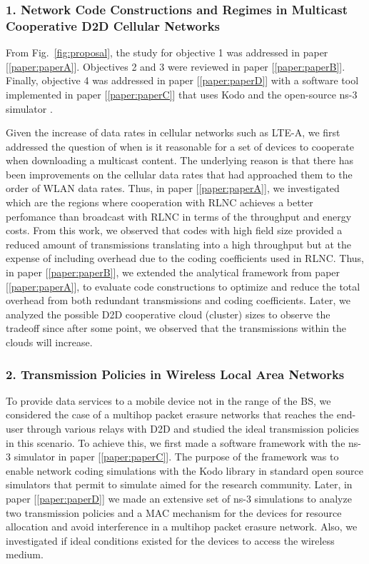\subsubsection{1. Network Code Constructions and Regimes in Multicast Cooperative D2D Cellular Networks}

From Fig.~\ref{fig:proposal}, the study for objective 1 was addressed in paper {[\ref{paper:paperA}]}. Objectives 2 and 3 were reviewed in paper {[\ref{paper:paperB}]}. Finally, objective 4 was addressed in paper {[\ref{paper:paperD}]} with a software tool implemented in paper {[\ref{paper:paperC}]} that uses Kodo and the open-source ns-3 simulator \cite{ns3link}.

Given the increase of data rates in cellular networks such as \ac{LTE-A}, we first addressed the question of when is it reasonable for a set of devices to cooperate when downloading a multicast content. The underlying reason is that there has been improvements on the cellular data rates that had approached them to the order of \ac{WLAN} data rates. Thus, in paper {[\ref{paper:paperA}]}, we investigated which are the regions where cooperation with \ac{RLNC} achieves a better perfomance than broadcast with \ac{RLNC} in terms of the throughput and energy costs. From this work, we observed that codes with high field size provided a reduced amount of transmissions translating into a high throughput but at the expense of including overhead due to the coding coefficients used in \ac{RLNC}. Thus, in paper {[\ref{paper:paperB}]}, we extended the analytical framework from paper {[\ref{paper:paperA}]}, to evaluate code constructions to optimize and reduce the total overhead from both redundant transmissions and coding coefficients. Later, we analyzed the possible \ac{D2D} cooperative cloud (cluster) sizes to observe the tradeoff since after some point, we observed that the transmissions within the clouds will increase.

\subsubsection{2. Transmission Policies in Wireless Local Area Networks}

To provide data services to a mobile device not in the range of the \ac{BS}, we considered the case of a multihop packet erasure networks that reaches the end-user through various relays with \ac{D2D} and studied the ideal transmission policies in this scenario. To achieve this, we first made a software framework with the ns-3 simulator \cite{kodons3link,kodons3tutorial} in paper {[\ref{paper:paperC}]}. The purpose of the framework was to enable network coding simulations with the Kodo library in standard open source simulators that permit to simulate aimed for the research community. Later, in paper {[\ref{paper:paperD}]} we made an extensive set of ns-3 simulations to analyze two transmission policies and a \ac{MAC} mechanism for the devices for resource allocation and avoid interference in a multihop packet erasure network. Also, we investigated if ideal conditions existed for the devices to access the wireless medium.

\clearpage